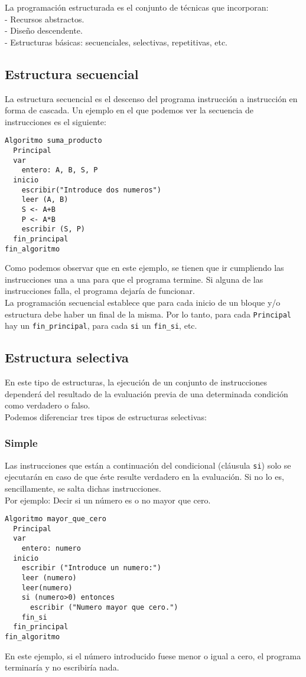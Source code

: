 \documentclass[12pt,letterpaper]{article}
\begin{document}
La programación estructurada es el conjunto de técnicas que incorporan:\\
- Recursos abstractos.\\
- Diseño descendente.\\
- Estructuras básicas: secuenciales, selectivas, repetitivas, etc.

\subsection{Estructura secuencial}

La estructura secuencial es el descenso del programa instrucción a instrucción en forma de cascada.
Un ejemplo en el que podemos ver la secuencia de instrucciones es el siguiente:
\begin{lstlisting}
Algoritmo suma_producto
  Principal
  var
    entero: A, B, S, P
  inicio
    escribir("Introduce dos numeros")
    leer (A, B)
    S <- A+B
    P <- A*B
    escribir (S, P)
  fin_principal
fin_algoritmo
\end{lstlisting}
Como podemos observar que en este ejemplo, se tienen que ir cumpliendo las instrucciones una a una para que el programa termine. Si alguna de las instrucciones falla, el programa dejaría de funcionar.\\
La programación secuencial establece que para cada inicio de un bloque y/o estructura debe haber un final de la misma. Por lo tanto, para cada \texttt{Principal} hay un \texttt{fin\_principal}, para cada \texttt{si} un \texttt{fin\_si}, etc.

\subsection{Estructura selectiva}

En este tipo de estructuras, la ejecución de un conjunto de instrucciones dependerá del resultado de la evaluación previa de una determinada condición como verdadero o falso.\\
Podemos diferenciar tres tipos de estructuras selectivas:

\subsubsection{Simple}

Las instrucciones que están a continuación del condicional (cláusula \texttt{si}) solo se ejecutarán en caso de que éste resulte verdadero en la evaluación. Si no lo es, sencillamente, se salta dichas instrucciones.\\
Por ejemplo: Decir si un número es o no mayor que cero.
\begin{lstlisting}
Algoritmo mayor_que_cero
  Principal
  var
    entero: numero
  inicio
    escribir ("Introduce un numero:")
    leer (numero)
    leer(numero)
    si (numero>0) entonces
      escribir ("Numero mayor que cero.")
    fin_si
  fin_principal
fin_algoritmo
\end{lstlisting}
En este ejemplo, si el número introducido fuese menor o igual a cero, el programa terminaría y no escribiría nada.
\end{document}
